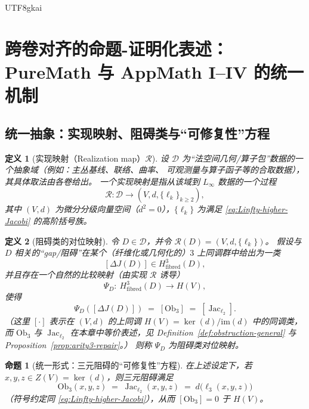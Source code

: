\documentclass[12pt]{article}
\newtheorem{definition}{定义}[section]
\newtheorem{proposition}{命题}[section]
\newcommand{\Layer}{\ensuremath{\ell}}
\newcommand{\Jac}{\operatorname{Jac}}
\newcommand{\Ob}{\mathrm{Ob}}
\begin{document}
\begin{CJK*}{UTF8}{gkai}

\section{跨卷对齐的命题-证明化表述：PureMath 与 AppMath I--IV 的统一机制}
\label{sec:cross-volume-alignment-prop-proof}

\subsection{统一抽象：实现映射、阻碍类与“可修复性”方程}

\begin{definition}[实现映射（Realization map）$\mathcal{R}$]
\label{def:realization-map}
设 $\mathcal{D}$ 为“法空间几何/算子包”数据的一个抽象域（例如：主丛基线、联络、曲率、
可观测量与算子函子等的合取数据），其具体取法由各卷给出。
一个\emph{实现映射}是指从该域到 $L_\infty$ 数据的一个过程
\[
  \mathcal{R}:\mathcal{D}\longrightarrow (V,d,\{\Layer_k\}_{k\ge 2}),
\]
其中 $(V,d)$ 为微分分级向量空间（$d^2=0$），$\{\Layer_k\}$ 为满足
\eqref{eq:Linfty-higher-Jacobi} 的高阶括号族。
\end{definition}

\begin{definition}[阻碍类的对位映射]
令 $D\in\mathcal{D}$，并令 $\mathcal{R}(D)=(V,d,\{\Layer_k\})$。
假设与 $D$ 相关的“gap/阻碍”在某个（纤维化或几何化的）$3$ 上同调群中给出为一类
\[
  [\Delta J(D)]\in H^3_{\mathrm{fibred}}(D),
\]
并且存在一个自然的比较映射（由实现 $\mathcal{R}$ 诱导）
\[
  \Psi_D:\ H^3_{\mathrm{fibred}}(D)\longrightarrow H(V),
\]
使得
\[
  \Psi_D([\Delta J(D)]) \;=\; [\Ob_3] \;=\; [\Jac_{\Layer_2}].
\]
（这里 $[\cdot]$ 表示在 $(V,d)$ 的上同调 $H(V)=\ker(d)/\mathrm{im}(d)$ 中的同调类，
而 $\Ob_3$ 与 $\Jac_{\Layer_2}$ 在本章中等价表述，见 Definition~\ref{def:obstruction-general} 与
Proposition~\ref{prop:arity3-repair}。）
则称 $\Psi_D$ 为\emph{阻碍类对位映射}。
\end{definition}

\begin{proposition}[统一形式：三元阻碍的“可修复性”方程]
\label{prop:unified-repair-equation-arity3}
在上述设定下，若 $x,y,z\in Z(V)=\ker(d)$，则三元阻碍满足
\[
  \Ob_3(x,y,z)\;=\;\Jac_{\Layer_2}(x,y,z)\;=\;d\bigl(\Layer_3(x,y,z)\bigr)
\]
（符号约定同 \eqref{eq:Linfty-higher-Jacobi}），从而 $[\Ob_3]=0$ 于 $H(V)$。
\end{proposition}


\end{CJK*}
\end{document}
